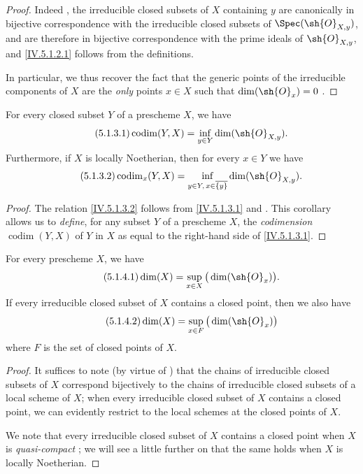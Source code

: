 \begin{proof}
Indeed , the irreducible closed subsets of $X$ containing $y$ are canonically in bijective correspondence with the irreducible closed subsets of $\Spec(\sh{O}_{X,y})$, and are therefore in bijective correspondence with the prime ideals of $\sh{O}_{X,y}$, and \eqref{IV.5.1.2.1} follows from the definitions.

In particular, we thus recover the fact that the generic points of the irreducible components of $X$ are the \emph{only} points $x\in X$ such that $\dim(\sh{O}_x)=0$ .
\end{proof}

\begin{corollary}[5.1.3]
\label{IV.5.1.3}
For every closed subset $Y$ of a prescheme $X$, we have
\[
\tag{5.1.3.1}\label{IV.5.1.3.1}
  \operatorname{codim}(Y, X) = \inf_{y\in Y} \dim(\sh{O}_{X,y}).
\]
Furthermore, if $X$ is locally Noetherian, then for every $x\in Y$ we have
\[
\tag{5.1.3.2}\label{IV.5.1.3.2}
  \operatorname{codim}_x(Y, X) = \inf_{\substack{y\in Y,\, x\in\overline{\{y\}}}} \dim(\sh{O}_{X,y}).
\]
\end{corollary}

\begin{proof}
The relation \eqref{IV.5.1.3.2} follows from \eqref{IV.5.1.3.1} and .
This corollary allows us to \emph{define}, for any subset $Y$ of a prescheme $X$, the \emph{codimension} $\operatorname{codim}(Y,X)$ of $Y$ in $X$ as equal to the right-hand side of \eqref{IV.5.1.3.1}.
\end{proof}

\begin{proposition}[5.1.4]
\label{IV.5.1.4}
For every prescheme $X$, we have
\[
\tag{5.1.4.1}\label{IV.5.1.4.1}
  \dim(X) = \sup_{x\in X}\big(\dim(\sh{O}_x)\big).
\]
If every irreducible closed subset of $X$ contains a closed point, then we also have
\[
\tag{5.1.4.2}\label{IV.5.1.4.2}
  \dim(X) = \sup_{x\in F}\big(\dim(\sh{O}_x)\big)
\]
where $F$ is the set of closed points of $X$.
\end{proposition}

\begin{proof}
It suffices to note (by virtue of ) that the chains of irreducible closed subsets of $X$ correspond bijectively to the chains of irreducible closed subsets of a local scheme of $X$; when every irreducible closed subset of $X$ contains a closed point, we can evidently restrict to the local schemes at the closed points of $X$.

We note that every irreducible closed subset of $X$ contains a closed point when $X$ is \emph{quasi-compact} ; we will see a little further on  that the same holds when $X$ is locally Noetherian.
\end{proof}

